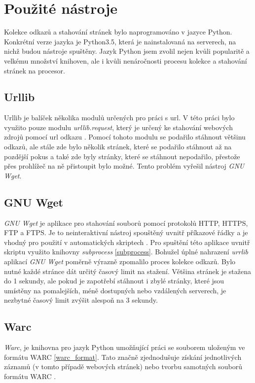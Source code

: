 \section{Použité nástroje}
Kolekce odkazů a stahování stránek bylo naprogramováno v jazyce Python. Konkrétní verze jazyka je Python3.5, která je nainstalovaná na serverech,
na nichž budou nástroje spuštěny. Jazyk Python jsem zvolil nejen kvůli popularitě a velkému množství knihoven, ale i kvůli nenáročnosti
procesu kolekce a stahování stránek na procesor.

\subsection{Urllib}
\label{urllib}
Urllib je balíček několika modulů určených pro práci s url. V této práci bylo využito pouze modulu \textit{urllib.request},
který je určený ke stahování webových zdrojů pomocí url odkazu \cite{URLLIB}. Pomocí tohoto modulu se podařilo stáhnout většinu
odkazů, ale stále zde bylo několik stránek, které se podařilo stáhnout až na pozdější pokus a také zde byly stránky, které
se stáhnout nepodařilo, přestože přes prohlížeč na ně přistoupit bylo možné. Tento problém vyřešil nástroj \textit{GNU Wget}.

\subsection{GNU Wget}
\label{wget}
\textit{GNU Wget} je aplikace pro stahování souborů pomocí protokolů HTTP, HTTPS, FTP a FTPS. Je to neinteraktivní nástroj spouštěný uvnitř
příkazové řádky a je vhodný pro použití v automatických skriptech \cite{WGET}. Pro spuštění této aplikace uvnitř skriptu využito knihovny \textit{subprocess} \ref{subprocess}.
Bohužel úplné nahrazení \textit{urrlib} aplikací \textit{GNU Wget} poměrně výrazně zpomalilo proces kolekce odkazů. Bylo nutné každé stránce dát určitý časový limit
na stažení. Většina stránek je stažena do 1 sekundy, ale pokud je zapotřebí stáhnout i zbylé stránky, které jsou umístěny na pomalejších, méně dostupných
nebo vzdálených serverech, je nezbytné časový limit zvýšit alespoň na 3 sekundy.

\subsection{Warc}
\label{warc}
\textit{Warc}, je knihovna pro jazyk Python umožňující práci se souborem uloženým ve formátu WARC \ref{warc_format}. Tato
značně zjednodušuje získání jednotlivých záznamů (v tomto případě webových stránek) nebo tvorbu samotných souborů
formátu WARC \cite{WARC}.

